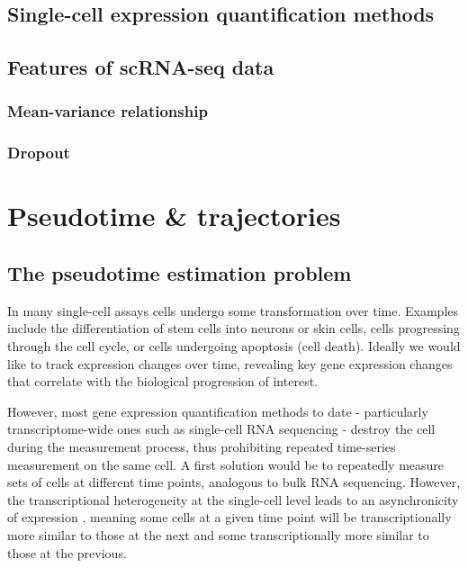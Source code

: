 \subsection{Single-cell expression quantification methods}

\subsection{Features of scRNA-seq data}

\subsubsection{ Mean-variance relationship}

\subsubsection{Dropout}

\section{Pseudotime \& trajectories}

\subsection{The pseudotime estimation problem}

In many single-cell assays cells undergo some transformation over time. Examples include the differentiation of stem cells into neurons or skin cells, cells progressing through the cell cycle, or cells undergoing apoptosis (cell death). Ideally we would like to track expression changes over time, revealing key gene expression changes that correlate with the biological progression of interest.

However, most gene expression quantification methods to date - particularly transcriptome-wide ones such as single-cell RNA sequencing - destroy the cell during the measurement process, thus prohibiting repeated time-series measurement on the same cell. A first solution would be to repeatedly measure sets of cells at different time points, analogous to bulk RNA sequencing. However, the transcriptional heterogeneity at the single-cell level leads to an asynchronicity of expression \cite{Trapnell2014-xi}, meaning some cells at a given time point will be transcriptionally more similar to those at the next and some transcriptionally more similar to those at the previous.

